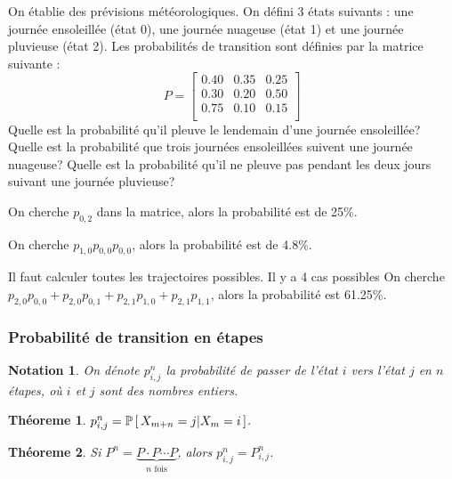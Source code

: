 \documentclass[11pt]{article}
\newcommand\Pg[2]{%
	\ensuremath{%
		\mathbb{P}\left[\,#1\middle\rvert#2\,\right]%
	}%
}%
\newtheorem{theoreme}{Théoreme}[section]
\newtheorem*{notation}{Notation}
\theoremstyle{remark}
\theoremstyle{definition}
\begin{document}
\begin{exemple}
	On établie des prévisions météorologiques. On défini 3 états suivants : une
	journée ensoleillée (état 0), une journée nuageuse (état 1) et une journée
	pluvieuse (état 2). Les probabilités de transition sont définies par la
	matrice suivante :
	\begin{equation*}
		P=\left[
			\begin{matrix}
				0.40 & 0.35 & 0.25\\
				0.30 & 0.20 & 0.50\\
				0.75 & 0.10 & 0.15\\
			\end{matrix}
		\right]
	\end{equation*}
	Quelle est la probabilité qu'il pleuve le lendemain d'une journée
	ensoleillée? Quelle est la probabilité que trois journées ensoleillées
	suivent une journée nuageuse? Quelle est la probabilité qu'il ne pleuve pas
	pendant les deux jours suivant une journée pluvieuse?

	On cherche $p_{0,2}$ dans la matrice, alors la probabilité est de 25\%.

	On cherche $p_{1,0}p_{0,0}p_{0,0}$, alors la probabilité est de 4.8\%.

	Il faut calculer toutes les trajectoires possibles. Il y a 4 cas possibles
	On cherche $p_{2,0}p_{0,0}+p_{2,0}p_{0,1}+p_{2,1}p_{1,0}+p_{2,1}p_{1,1}$,
	alors la probabilité est 61.25\%.
\end{exemple}

\subsubsection{Probabilité de transition en  étapes}
\begin{notation}
	On dénote $p_{i,j}^n$ la probabilité de passer de l'état $i$ vers l'état
	$j$ en $n$ étapes, où $i$ et $j$ sont des nombres entiers.
\end{notation}

\begin{theoreme}
	$p_{i,j}^n=\Pg{X_{m+n}=j}{X_m=i}$.
\end{theoreme}

\begin{theoreme}
	Si $P^n=\underbrace{P\cdot P\cdots P}_{\text{$n$ fois}}$, alors $p_{i,j}^n
	=P_{i,j}^n$.
\end{theoreme}
\end{document}
